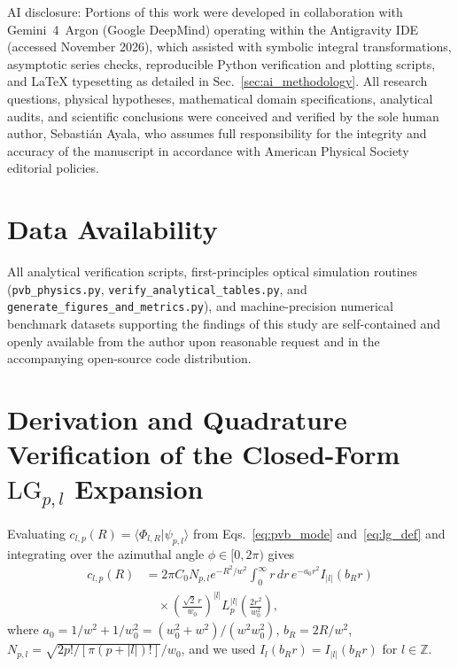 \documentclass[aps,pra,reprint,amsmath,amssymb,floatfix,longbibliography]{revtex4-2}
\providecommand{\braket}[2]{\langle#1\vert#2\rangle}
\providecommand{\abs}[1]{\lvert#1\rvert}
\begin{document}
\begin{acknowledgments}
AI disclosure: Portions of this work were developed in collaboration with Gemini~4~Argon (Google DeepMind) operating within the Antigravity IDE (accessed November 2026), which assisted with symbolic integral transformations, asymptotic series checks, reproducible Python verification and plotting scripts, and \LaTeX{} typesetting as detailed in Sec.~\ref{sec:ai_methodology}. All research questions, physical hypotheses, mathematical domain specifications, analytical audits, and scientific conclusions were conceived and verified by the sole human author, Sebasti\'an Ayala, who assumes full responsibility for the integrity and accuracy of the manuscript in accordance with American Physical Society editorial policies.
\end{acknowledgments}

\section*{Data Availability}
All analytical verification scripts, first-principles optical simulation routines (\texttt{pvb\_\allowbreak physics.py}, \texttt{verify\_\allowbreak analytical\_\allowbreak tables.py}, and \texttt{generate\_\allowbreak figures\_\allowbreak and\_\allowbreak metrics.py}), and machine-precision numerical benchmark datasets supporting the findings of this study are self-contained and openly available from the author upon reasonable request and in the accompanying open-source code distribution.

\appendix
\section{Derivation and Quadrature Verification of the Closed-Form \texorpdfstring{$\mathrm{LG}_{p,l}$}{LG\_\{p,l\}} Expansion}
\label{app:lg_expansion}

Evaluating $c_{l,p}(R) = \braket{\Phi_{l,R}}{\psi_{p,l}}$ from Eqs.~\eqref{eq:pvb_mode} and~\eqref{eq:lg_def} and integrating over the azimuthal angle $\phi \in [0,2\pi)$ gives
\begin{align}
c_{l,p}(R) &= 2\pi C_0 N_{p,l} e^{-R^2/w^2} \int_0^\infty r\,dr\, e^{-a_0 r^2} I_{\abs{l}}(b_R r) \nonumber \\
&\quad \times \left(\frac{\sqrt{2}\,r}{w_0}\right)^{\abs{l}} L_p^{\abs{l}}\!\left(\frac{2r^2}{w_0^2}\right),
\label{eq:app_c_int}
\end{align}
where $a_0 = 1/w^2 + 1/w_0^2 = (w_0^2+w^2)/(w^2 w_0^2)$, $b_R = 2R/w^2$, $N_{p,l} = \sqrt{2p!/[\pi(p+\abs{l})!]}/w_0$, and we used $I_l(b_R r) = I_{\abs{l}}(b_R r)$ for $l \in \mathbb{Z}$.
\end{document}
